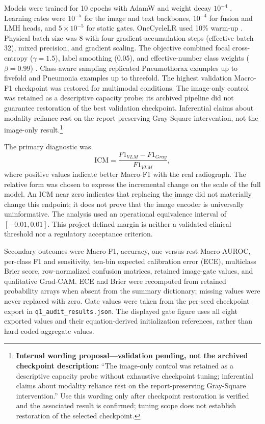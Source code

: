 \documentclass[a4paper,fleqn]{cas-sc}
\begin{document}
Models were trained for 10 epochs with AdamW and weight decay $10^{-4}$
\cite{loshchilov2019adamw}. Learning rates were $10^{-5}$ for the image and text
backbones, $10^{-4}$ for fusion and LMH heads, and $5\times10^{-5}$ for static
gates. OneCycleLR used 10\% warm-up \cite{smith2019superconvergence}. Physical
batch size was 8 with four gradient-accumulation steps (effective batch 32),
mixed precision, and gradient scaling. The objective combined focal
cross-entropy ($\gamma=1.5$), label smoothing (0.05), and effective-number class
weights ($\beta=0.99$) \cite{lin2017focalloss}. Class-aware sampling replicated
Pneumothorax examples up to fivefold and Pneumonia examples up to threefold.
The highest validation Macro-F1 checkpoint was restored for multimodal
conditions. The image-only control was retained as a descriptive capacity
probe; its archived pipeline did not guarantee restoration of the best
validation checkpoint. Inferential claims about modality reliance rest on the
report-preserving Gray-Square intervention, not the image-only result.\footnote{
\textbf{Internal wording proposal---validation pending, not the archived
checkpoint description:} ``The image-only control was retained as a descriptive
capacity probe without exhaustive checkpoint tuning; inferential claims about
modality reliance rest on the report-preserving Gray-Square intervention.''
Use this wording only after checkpoint restoration is verified and the
associated result is confirmed; tuning scope does not establish restoration
of the selected checkpoint.}

The primary diagnostic was
\begin{equation}
\mathrm{ICM}=\frac{F1_{VLM}-F1_{Gray}}{F1_{VLM}},
\end{equation}
where positive values indicate better Macro-F1 with the real radiograph. The
relative form was chosen to express the incremental change on the scale of the
full model. An ICM near zero indicates that replacing the image did not
materially change this endpoint; it does not prove that the image encoder is
universally uninformative. The analysis used an operational equivalence interval
of $[-0.01,0.01]$. This project-defined margin is neither a validated clinical
threshold nor a regulatory acceptance criterion.

Secondary outcomes were Macro-F1, accuracy, one-versus-rest Macro-AUROC,
per-class F1 and sensitivity, ten-bin expected calibration error (ECE),
multiclass Brier score, row-normalized confusion matrices, retained image-gate
values, and qualitative Grad-CAM. ECE and Brier were recomputed from retained
probability arrays when absent from the summary dictionary; missing values were
never replaced with zero. Gate values were taken from the per-seed checkpoint
export in \texttt{q1\_audit\_results.json}. The displayed gate figure uses all
eight exported values and their equation-derived initialization references,
rather than hard-coded aggregate values.
\end{document}
